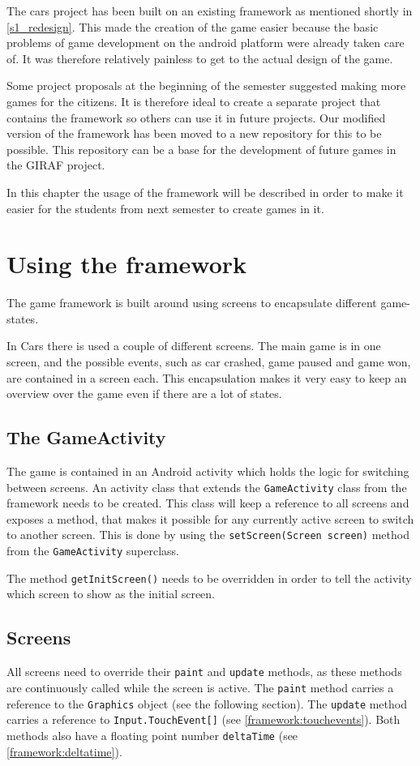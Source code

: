 \label{common_game_framework}
The cars project has been built on an existing framework as mentioned shortly in \cref{s1_redesign}. 
This made the creation of the game easier because the basic problems of game development on the android platform were already taken care of.
It was therefore relatively painless to get to the actual design of the game. 

Some project proposals at the beginning of the semester suggested making more games for the citizens.
It is therefore ideal to create a separate project that contains the framework so others can use it in future projects.
Our modified version of the framework has been moved to a new repository for this to be possible.
This repository can be a base for the development of future games in the GIRAF project.

In this chapter the usage of the framework will be described in order to make it easier for the students from next semester to create games in it.

\section{Using the framework}
The game framework is built around using screens to encapsulate different game-states. 

In Cars there is used a couple of different screens.
The main game is in one screen, and the possible events, such as car crashed, game paused and game won, are contained in a screen each.
This encapsulation makes it very easy to keep an overview over the game even if there are a lot of states.

\subsection{The GameActivity}
The game is contained in an Android activity which holds the logic for switching between screens.
An activity class that extends the \lstinline|GameActivity| class from the framework needs to be created.
This class will keep a reference to all screens and exposes a method, that makes it possible for any currently active screen to switch to another screen.
This is done by using the \lstinline|setScreen(Screen screen)| method from the \lstinline|GameActivity| superclass.

The method \lstinline|getInitScreen()| needs to be overridden in order to tell the activity which screen to show as the initial screen.

\subsection{Screens}
All screens need to override their \lstinline|paint| and \lstinline|update| methods, as these methods are continuously called while the screen is active.
The \lstinline|paint| method carries a reference to the \lstinline|Graphics| object (see the following section).
The \lstinline|update| method carries a reference to \lstinline|Input.TouchEvent[]| (see \cref{framework:touchevents}).
Both methods also have a floating point number \lstinline|deltaTime| (see \cref{framework:deltatime}).

